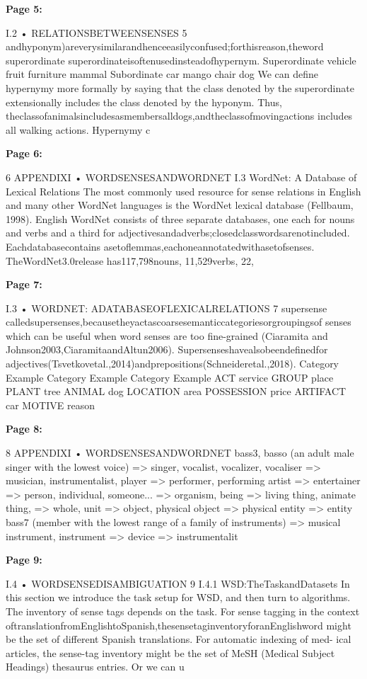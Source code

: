 \documentclass[11pt,a4paper]{article}
\begin{document}
\textbf{Page 5:}

I.2 • RELATIONSBETWEENSENSES 5
andhyponym)areverysimilarandhenceeasilyconfused;forthisreason,theword
superordinate superordinateisoftenusedinsteadofhypernym.
Superordinate vehicle fruit furniture mammal
Subordinate car mango chair dog
We can define hypernymy more formally by saying that the class denoted by
the superordinate extensionally includes the class denoted by the hyponym. Thus,
theclassofanimalsincludesasmembersalldogs,andtheclassofmovingactions
includes all walking actions. Hypernymy c

\textbf{Page 6:}

6 APPENDIXI • WORDSENSESANDWORDNET
I.3 WordNet: A Database of Lexical Relations
The most commonly used resource for sense relations in English and many other
WordNet languages is the WordNet lexical database (Fellbaum, 1998). English WordNet
consists of three separate databases, one each for nouns and verbs and a third for
adjectivesandadverbs;closedclasswordsarenotincluded. Eachdatabasecontains
asetoflemmas,eachoneannotatedwithasetofsenses. TheWordNet3.0release
has117,798nouns, 11,529verbs, 22,

\textbf{Page 7:}

I.3 • WORDNET: ADATABASEOFLEXICALRELATIONS 7
supersense calledsupersenses,becausetheyactascoarsesemanticcategoriesorgroupingsof
senses which can be useful when word senses are too fine-grained (Ciaramita and
Johnson2003,CiaramitaandAltun2006). Supersenseshavealsobeendefinedfor
adjectives(Tsvetkovetal.,2014)andprepositions(Schneideretal.,2018).
Category Example Category Example Category Example
ACT service GROUP place PLANT tree
ANIMAL dog LOCATION area POSSESSION price
ARTIFACT car MOTIVE reason

\textbf{Page 8:}

8 APPENDIXI • WORDSENSESANDWORDNET
bass3, basso (an adult male singer with the lowest voice)
=> singer, vocalist, vocalizer, vocaliser
=> musician, instrumentalist, player
=> performer, performing artist
=> entertainer
=> person, individual, someone...
=> organism, being
=> living thing, animate thing,
=> whole, unit
=> object, physical object
=> physical entity
=> entity
bass7 (member with the lowest range of a family of instruments)
=> musical instrument, instrument
=> device
=> instrumentalit

\textbf{Page 9:}

I.4 • WORDSENSEDISAMBIGUATION 9
I.4.1 WSD:TheTaskandDatasets
In this section we introduce the task setup for WSD, and then turn to algorithms.
The inventory of sense tags depends on the task. For sense tagging in the context
oftranslationfromEnglishtoSpanish,thesensetaginventoryforanEnglishword
might be the set of different Spanish translations. For automatic indexing of med-
ical articles, the sense-tag inventory might be the set of MeSH (Medical Subject
Headings) thesaurus entries. Or we can u
\end{document}
